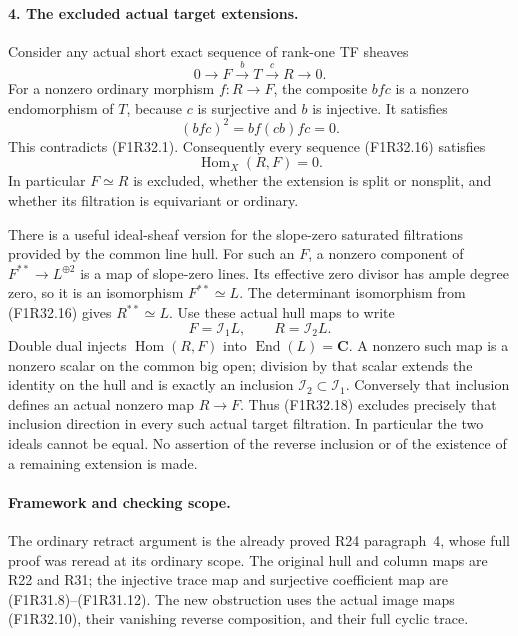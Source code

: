 \paragraph{4. The excluded actual target extensions.}
Consider any actual short exact
sequence of rank-one TF sheaves
\[
                0\longrightarrow F\xrightarrow{b}T
                          \xrightarrow{c}R\longrightarrow0.
 \tag{F1R32.16}
\]
For a nonzero ordinary morphism
$f:R\to F$, the composite
$bfc$ is a nonzero endomorphism of
$T$, because $c$ is surjective and
$b$ is injective. It satisfies
\[
                        (bfc)^2=bf(cb)fc=0.
 \tag{F1R32.17}
\]
This contradicts (F1R32.1).
Consequently every sequence
(F1R32.16) satisfies
\[
                               \operatorname{Hom}_X(R,F)=0.
 \tag{F1R32.18}
\]
In particular $F\simeq R$ is
excluded, whether the extension is
split or nonsplit, and whether its
filtration is equivariant or ordinary.

There is a useful ideal-sheaf version
for the slope-zero saturated filtrations
provided by the common line hull.
For such an $F$, a nonzero component
of $F^{**}\to L^{\oplus2}$ is a
map of slope-zero lines. Its effective
zero divisor has ample degree zero,
so it is an isomorphism $F^{**}\simeq L$.
The determinant isomorphism from
(F1R32.16) gives $R^{**}\simeq L$.
Use these actual hull maps to write
\[
                         F=\mathcal I_1L,\qquad
                         R=\mathcal I_2L.
 \tag{F1R32.19}
\]
Double dual injects $\operatorname{Hom}(R,F)$
into $\operatorname{End}(L)=\mathbf C$.
A nonzero such map is a nonzero
scalar on the common big open;
division by that scalar extends
the identity on the hull and is
exactly an inclusion
$\mathcal I_2\subset\mathcal I_1$.
Conversely that inclusion defines
an actual nonzero map $R\to F$.
Thus (F1R32.18) excludes precisely
that inclusion direction in every
such actual target filtration. In
particular the two ideals cannot be
equal. No assertion of the reverse
inclusion or of the existence of a
remaining extension is made.

\paragraph{Framework and checking scope.}
The ordinary retract argument is the
already proved R24 paragraph~4, whose
full proof was reread at its ordinary
scope. The original hull and column
maps are R22 and R31; the injective
trace map and surjective coefficient
map are (F1R31.8)--(F1R31.12).
The new obstruction uses the actual
image maps (F1R32.10), their vanishing
reverse composition, and their full
cyclic trace.

